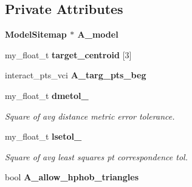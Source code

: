 \subsection*{Private Attributes}
\begin{CompactItemize}
\item 
\bf{Model\-Sitemap} $\ast$ \textbf{A\_\-model}\label{classSimSite3D_1_1MatchTriangles_4a2674b892098a9041d2d64240545d3d}

\item 
my\_\-float\_\-t \textbf{target\_\-centroid} [3]\label{classSimSite3D_1_1MatchTriangles_3c8d67e4f6f23bb114deaffd0e983c06}

\item 
interact\_\-pts\_\-vci \textbf{A\_\-targ\_\-pts\_\-beg}\label{classSimSite3D_1_1MatchTriangles_db2be75b7d41089ed59a31b0fd6ab4d0}

\item 
my\_\-float\_\-t \bf{dmetol\_}\label{classSimSite3D_1_1MatchTriangles_285278f41b70244a22984cf328522494}

\begin{CompactList}\small\item\em Square of avg distance metric error tolerance. \item\end{CompactList}\item 
my\_\-float\_\-t \bf{lsetol\_}\label{classSimSite3D_1_1MatchTriangles_4f725552c68b6de6e1d49a9796a3165b}

\begin{CompactList}\small\item\em Square of avg least squares pt correspondence tol. \item\end{CompactList}\item 
bool \textbf{A\_\-allow\_\-hphob\_\-triangles}\label{classSimSite3D_1_1MatchTriangles_0987b2902ceeac3e785e3a44db49f6f0}

\end{CompactItemize}
